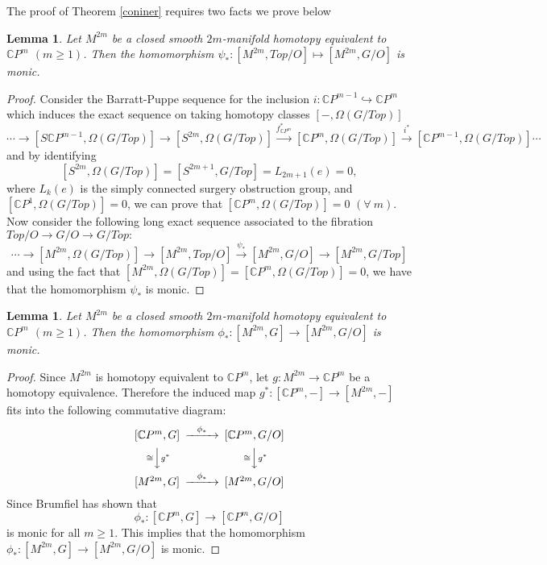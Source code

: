 \documentclass[a4paper,leqno,12pt]{amsart}
\theoremstyle{plain}
\newtheorem{lemma}[theorem]{Lemma}
\theoremstyle{definition}
\numberwithin{equation}{section}
\begin{document}
The proof of Theorem \ref{coniner} requires two facts we prove below
\begin{lemma}\label{lem1}
Let $M^{2m}$ be a closed smooth $2m$-manifold homotopy equivalent to $\mathbb{C}P^{m}$ $(m\geq 1)$. Then the homomorphism $\psi_{*}:[M^{2m},Top/O]\mapsto [M^{2m}, G/O]$ is monic.
\end{lemma}
\begin{proof}
Consider the Barratt-Puppe sequence for the inclusion $i:\mathbb{C} P^{m-1}\hookrightarrow \mathbb{C} P^{m}$ which induces the exact sequence on taking homotopy classes $[-,\Omega(G/Top)]$
$$\cdots \to [S\mathbb{C} P^{m-1}, \Omega(G/Top)]{\to}[S^{2m},\Omega(G/Top)] \stackrel{f^{*}_{\mathbb{C} P^{m}}}{\to} [\mathbb{C} P^{m}, \Omega(G/Top)] \stackrel{i^{*}}{\to}[\mathbb{C} P^{m-1}, \Omega(G/Top)]\cdots $$
and by identifying 
$$[S^{2m}, \Omega(G/Top)]=[S^{2m+1}, G/Top]=L_{2m+1}(e)=0,$$ 
where $L_{k}(e)$ is the simply connected surgery obstruction group, and $[\mathbb{C} P^{1}, \Omega(G/Top)]=0$, we can prove that $[\mathbb{C}P^{m}, \Omega(G/Top)]=0$ $(\forall~ m)$. Now consider the following long exact sequence associated to the fibration $Top/O\to G/O\to G/Top:$ 
$$\cdots \to [M^{2m},\Omega(G/Top)]\to [M^{2m},Top/O]\stackrel{\psi_{*}}\to [M^{2m},G/O] \to [M^{2m},G/Top] $$ 
and using the fact that $[M^{2m},\Omega(G/Top)]=[\mathbb{C}P^m,\Omega(G/Top)]=0$, we have that the homomorphism $\psi_{*}$ is monic.
\end{proof}
\begin{lemma}\label{lem2}
Let $M^{2m}$ be a closed smooth $2m$-manifold homotopy equivalent to $\mathbb{C}P^{m}$ $(m\geq 1)$. Then the homomorphism $\phi_{*}:[M^{2m},G]\to [M^{2m},G/O]$ is monic.
\end{lemma}
\begin{proof}
Since $M^{2m}$ is homotopy equivalent to $\mathbb{C}P^{m}$, let $g:M^{2m} \to \mathbb{C}P^{m}$ be a homotopy equivalence. Therefore the induced map $g^{*}:[\mathbb{C}P^m,-]\to [M^{2m},-]$ fits into the following commutative diagram:
$$
\begin{CD}
[\mathbb{C}P^{m},G]@>\phi_{*}>>[\mathbb{C}P^{m},G/O]\\
@V\cong Vg^{*}V      @V\cong Vg^{*}V\\
[M^{2m},G]  @>\phi_{*}>> [M^{2m},G/O]
\end{CD}
$$
Since Brumfiel \cite[p.77]{Bru71} has shown that $$\phi_{*}:[\mathbb{C}P^{m},G]\to [\mathbb{C}P^{m},G/O]$$ is monic for all 
$m\geq 1$. This implies that the homomorphism $\phi_{*}:[M^{2m},G]\to [M^{2m},G/O]$ is monic. 
\end{proof}
\end{document}
